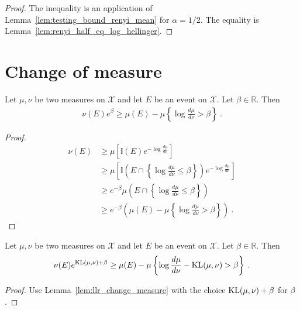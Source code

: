 \begin{proof}
The inequality is an application of Lemma~\ref{lem:testing_bound_renyi_mean} for $\alpha = 1/2$. The equality is Lemma~\ref{lem:renyi_half_eq_log_hellinger}.
\end{proof}

\section{Change of measure}

\begin{lemma}
  \label{lem:llr_change_measure}
  Let $\mu, \nu$ be two measures on $\mathcal X$ and let $E$ be an event on $\mathcal X$. Let $\beta \in \mathbb{R}$. Then
  \begin{align*}
  \nu(E) e^{\beta} \ge \mu(E) - \mu\left\{ \log\frac{d \mu}{d \nu} > \beta \right\} \: .
  \end{align*}
\end{lemma}

\begin{proof}
\begin{align*}
\nu(E)
&\ge \mu\left[\mathbb{I}(E) e^{- \log\frac{d \mu}{d \nu} }\right]
\\
&\ge \mu\left[\mathbb{I}\left(E \cap \left\{\log\frac{d \mu}{d \nu} \le \beta\right\}\right) e^{- \log\frac{d \mu}{d \nu} }\right]
\\
&\ge e^{- \beta}\mu\left(E \cap \left\{\log\frac{d \mu}{d \nu} \le \beta\right\}\right)
\\
&\ge e^{- \beta}\left( \mu(E) - \mu\left\{ \log\frac{d \mu}{d \nu} > \beta \right\} \right)
\: .
\end{align*}
\end{proof}

\begin{corollary}
  \label{cor:kl_change_measure}
  Let $\mu, \nu$ be two measures on $\mathcal X$ and let $E$ be an event on $\mathcal X$. Let $\beta \in \mathbb{R}$. Then
  \begin{align*}
  \nu(E) e^{\mathrm{KL}(\mu, \nu) + \beta} \ge \mu(E) - \mu\left\{ \log\frac{d \mu}{d \nu} - \mathrm{KL}(\mu, \nu) > \beta \right\} \: .
  \end{align*}
\end{corollary}

\begin{proof}
Use Lemma~\ref{lem:llr_change_measure} with the choice $\mathrm{KL}(\mu, \nu) + \beta$ for $\beta$.
\end{proof}

